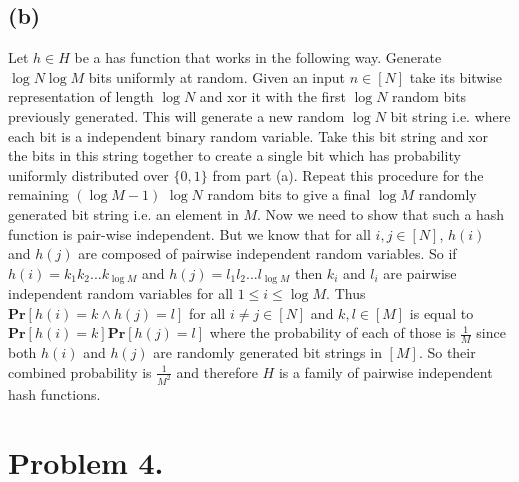 \documentclass[12pt]{article}
\begin{document}
\subsection*{(b)} Let $h \in H$ be a has function that works in the following
way. Generate $\log N \log M$ bits uniformly at random. Given an input
$n \in [N]$ take its bitwise representation of length $\log N$ and xor it with
the first $\log N$ random bits previously generated. This will generate a new
random $\log N$ bit string i.e. where each bit is a independent binary random
variable. Take this bit string and xor the bits in this string together to
create a single bit which has probability uniformly distributed over $\{0,1\}$
from part (a). Repeat this procedure for the remaining $(\log M - 1)$ $\log N$
random bits to give a final $\log M$ randomly generated bit string i.e. an
element in $M$. Now we need to show that such a hash function is pair-wise
independent. But we know that for all $i,j \in [N]$, $h(i)$ and $h(j)$ are
composed of pairwise independent random variables. So if
$h(i) = k_1k_2...k_{\log M}$ and $h(j) = l_1l_2...l_{\log M}$ then $k_i$ and
$l_i$ are pairwise independent random variables for all $1 \le i \le \log M$.
Thus $\textbf{Pr}[h(i) = k \wedge h(j) = l]$ for all $i \neq j \in [N]$ and
$k,l \in [M]$ is equal to $\textbf{Pr}[h(i) = k]\textbf{Pr}[h(j) = l]$ where the
probability of each of those is $\frac{1}{M}$ since both $h(i)$ and $h(j)$
are randomly generated bit strings in $[M]$. So their combined probability is
$\frac{1}{M^2}$ and therefore $H$ is a family of pairwise independent hash
functions.

\newpage
\section*{Problem 4.}
\end{document}
